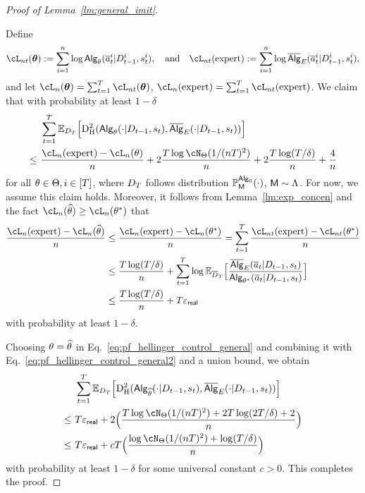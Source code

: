 \begin{proof}[Proof of Lemma~\ref{lm:general_imit}]~

Define \begin{align*}\cL_{nt}(\btheta):=\sum_{i=1}^n\log\sAlg_\Par(\eaction^\ith_{t}|\dset_{t-1}^\ith,\state^\ith_t),~~\text{ and }~~\cL_{nt}(\expert):=\sum_{i=1}^n\log\osAlg_{\shortexp}(\eaction^\ith_{t}|\dset_{t-1}^\ith,\state^\ith_t),\end{align*}  and let 
$\cL_n(\btheta)=\sum_{t=1}^\totlen \cL_{nt}(\btheta)$, $\cL_n(\expert)=\sum_{t=1}^\totlen \cL_{nt}(\expert)$. We claim that   with probability at least $1-\delta$ 
\begin{align}
&~ \sum_{t=1}^\totlen\E_{\dset_\totlen}\Big[\HelDs(\sAlg_\Par(\cdot|\dset_{t-1},\state_t),\osAlg_{\shortexp}(\cdot|\dset_{t-1},\state_t))\Big]\notag\\
\leq &~
\frac{\cL_{n}(\expert)-\cL_{n}(\Par)}{n}+2\frac{\totlen\log \cN_{\Parspace}(1/(\Numobs\totlen)^2)}{n}+2\frac{\totlen\log(\totlen/\delta)}{n}+\frac{4}{n}\label{eq:pf_hellinger_control_general}
\end{align}
for all ${\theta}\in{\Theta},i\in[T]$, where ${D}_{T}$ follows  distribution $\mathbb{P}_{\mathsf{M}}^{{\mathsf{Alg}}_0}(\cdot)$, ${\mathsf{M}}\sim{\Lambda}$. For now, we assume this claim holds. Moreover, it follows from Lemma~\ref{lm:exp_concen} and the fact $\cL_\Numobs(\EstPar)\geq\cL_\Numobs(\TruePar)$ that
\begin{align}
    \frac{\cL_\Numobs(\expert)-\cL_\Numobs(\EstPar)}{\Numobs}
    &\leq
      \frac{\cL_\Numobs(\expert)-\cL_\Numobs(\TruePar)}{\Numobs}=\sum_{t=1}^\totlen
      \frac{\cL_{\Numobs t}(\expert)-\cL_{\Numobs t}(\TruePar)}{\Numobs}\notag\\
      &\leq
      \frac{T\log(T/\delta)}{\Numobs}+\sum_{t=1}^\totlen\log\E_{\adset_\totlen}\Big[{\frac{\osAlg_{\shortexp}(\eaction_t|\dset_{t-1},\state_t)}{\sAlg_\TruePar(\eaction_t|\dset_{t-1},\state_t)}}\Big]\notag\\
&\leq
 \frac{T\log(T/\delta)}{\Numobs}+\totlen\geneps
\label{eq:pf_hellinger_control_general2}
\end{align}
with probability at least $1-\delta$.




Choosing ${\theta}={\widehat{\theta}}$ in Eq.~\eqref{eq:pf_hellinger_control_general} and combining it with Eq.~\eqref{eq:pf_hellinger_control_general2} and a union bound, we obtain
\begin{align*}
&~\sum_{t=1}^\totlen\E_{\dset_\totlen}\Big[\HelDs(\sAlg_\EstPar(\cdot|\dset_{t-1},\state_t),\osAlg_{\shortexp}(\cdot|\dset_{t-1},\state_t))\Big]\\
\leq &~
\totlen\geneps
+
2\Big(\frac{\totlen\log \cN_{\Parspace}(1/(\Numobs\totlen)^2)+2\totlen\log(2\totlen/\delta)+2}{n}\Big)\\
\leq&~ \totlen\geneps+c\totlen\Big(\frac{\log \cN_{\Parspace}(1/(\Numobs\totlen)^2)+\log(\totlen/\delta)}{n}\Big)
\end{align*}
with probability at least $1-\delta$ for some universal constant $c>0$.  This completes the proof. 


\end{proof}
